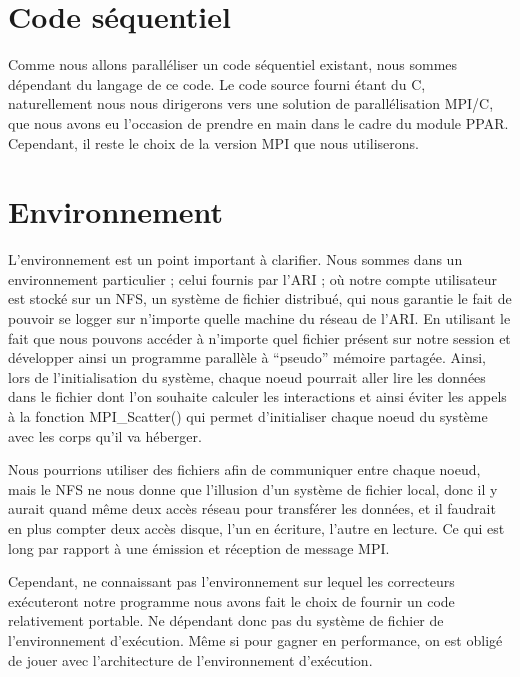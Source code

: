 \section{Code séquentiel}

\par Comme nous allons paralléliser un code séquentiel existant,
nous sommes dépendant du langage de ce code. Le code source fourni 
étant du C, naturellement nous nous dirigerons vers une solution 
de parallélisation MPI/C, que nous avons eu l'occasion de prendre 
en main dans le cadre du module PPAR. Cependant, il reste le choix de la 
version MPI que nous utiliserons.\\

\section{Environnement}

\par L'environnement est un point important à clarifier. Nous sommes dans un environnement particulier ; 
celui fournis par l'ARI ; où notre compte utilisateur est stocké sur un NFS, un système de fichier 
distribué, qui nous garantie le fait de pouvoir se logger sur n'importe quelle machine du réseau 
de l'ARI. En utilisant le fait que nous pouvons accéder à n'importe quel fichier présent sur 
notre session et développer ainsi un programme parallèle à ``pseudo'' mémoire partagée.
Ainsi, lors de l'initialisation du système, chaque noeud  pourrait aller lire les données dans le fichier
 dont l'on souhaite calculer les interactions et ainsi éviter les appels à la fonction 
MPI\_Scatter() qui permet d'initialiser chaque noeud du système avec les corps qu'il va héberger.\\

\par Nous pourrions utiliser des fichiers afin de communiquer entre chaque noeud, mais le NFS ne nous
donne que l'illusion d'un système de fichier local, donc il y aurait quand même deux accès réseau pour 
transférer les données, et il faudrait en plus compter deux accès disque, l'un en écriture, l'autre en lecture.
Ce qui est long par rapport à une émission et réception de message MPI.\\

\par Cependant, ne connaissant pas l'environnement sur lequel les correcteurs exécuteront notre 
programme nous avons fait le choix de fournir un code relativement portable. Ne dépendant donc pas du système
de fichier de l'environnement d'exécution.
Même si pour gagner en performance, on est obligé de jouer avec l'architecture de l'environnement d'exécution.\\


